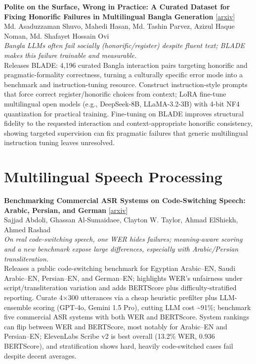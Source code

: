 \documentclass[12pt,letterpaper]{article}
\begin{document}
\medskip

{\small\textbf{Polite on the Surface, Wrong in Practice: A Curated Dataset for Fixing Honorific Failures in Multilingual Bangla Generation}} {\scriptsize[\href{https://arxiv.org/abs/2605.22487}{arxiv}]}\\
{\scriptsize Md. Asaduzzaman Shuvo, Mahedi Hasan, Md. Tashin Parvez, Azizul Haque Noman, Md. Shafayet Hossain Ovi}\\

{\small\textit{Bangla LLMs often fail socially (honorific/register) despite fluent text; BLADE makes this failure trainable and measurable.}}\\[1pt]
{\footnotesize Releases BLADE: 4,196 curated Bangla interaction pairs targeting honorific and pragmatic-formality correctness, turning a culturally specific error mode into a benchmark and instruction-tuning resource. Construct instruction-style prompts that force correct register/honorific choices from context; LoRA fine-tune multilingual open models (e.g., DeepSeek-8B, LLaMA-3.2-3B) with 4-bit NF4 quantization for practical training. Fine-tuning on BLADE improves structural fidelity to the requested interaction and context-appropriate honorific consistency, showing targeted supervision can fix pragmatic failures that generic multilingual instruction tuning leaves unresolved.}

\medskip


\section*{Multilingual Speech Processing}

{\small\textbf{Benchmarking Commercial ASR Systems on Code-Switching Speech: Arabic, Persian, and German}} {\scriptsize[\href{https://arxiv.org/abs/2605.19069}{arxiv}]}\\
{\scriptsize Sajjad Abdoli, Ghassan Al-Sumaidaee, Clayton W. Taylor, Ahmad ElShiekh, Ahmed Rashad}\\

{\small\textit{On real code-switching speech, one WER hides failures; meaning-aware scoring and a new benchmark expose large differences, especially with Arabic/Persian transliteration.}}\\[1pt]
{\footnotesize Releases a public code-switching benchmark for Egyptian Arabic--EN, Saudi Arabic--EN, Persian--EN, and German--EN; highlights WER's unfairness under script/transliteration variation and adds BERTScore plus difficulty-stratified reporting. Curate 4×300 utterances via a cheap heuristic prefilter plus LLM-ensemble scoring (GPT-4o, Gemini 1.5 Pro), cutting LLM cost \textasciitilde{}91\%; benchmark five commercial ASR systems with both WER and BERTScore. System rankings can flip between WER and BERTScore, most notably for Arabic--EN and Persian--EN; ElevenLabs Scribe v2 is best overall (13.2\% WER, 0.936 BERTScore), and stratification shows hard, heavily code-switched cases fail despite decent averages.}
\end{document}
